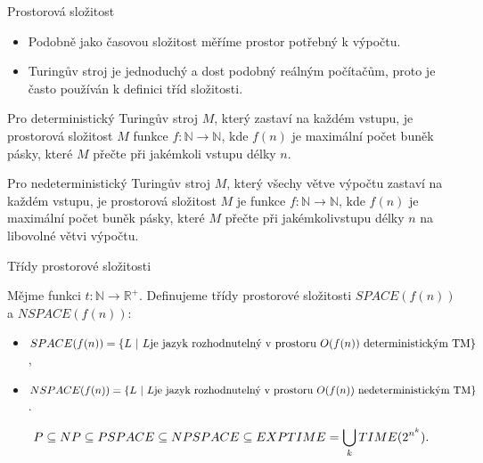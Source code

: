     
    \begin{frame}{Prostorová složitost}
    \begin{itemize}
        \item Podobně jako časovou složitost měříme prostor potřebný k výpočtu.
        \item Turingův stroj je jednoduchý a dost podobný reálným počítačům, proto je často používán k definici tříd složitosti.
    \end{itemize}
    \begin{definition}
    Pro deterministický Turingův stroj $M$, který zastaví na každém vstupu, je
    \alert{prostorová složitost} $M$ funkce $f:\mathbb{N}\to \mathbb{N}$, kde $f(n)$ je maximální počet buněk pásky, které  $M$ přečte při jakémkoli vstupu délky $n$.
    
    
    Pro nedeterministický Turingův stroj $M$, který všechy větve výpočtu zastaví na každém vstupu, je 
    \alert{prostorová složitost} $M$ je funkce $f:\mathbb{N}\to \mathbb{N}$, kde $f(n)$ je maximální počet buněk pásky, které  $M$ přečte při jakémkolivstupu délky $n$ na libovolné větvi výpočtu.
    
    \end{definition}
    \end{frame}
    
    \begin{frame}{Třídy prostorové složitosti}
    \begin{definition}
    Mějme funkci $t: \mathbb{N}\to \mathbb{R}^+$. Definujeme \alert{třídy prostorové složitosti } $SPACE(f(n))$ a $NSPACE(f(n))$: %
    \begin{itemize}
        \item $SPACE(f(n))=\{L \ |\  L \hbox{je jazyk rozhodnutelný v prostoru $O(f(n))$ deterministickým TM}\}$,
        \item $NSPACE(f(n))=\{L \ |\  L \hbox{je jazyk rozhodnutelný v prostoru $O(f(n))$ nedeterministickým TM}\}$.
    \end{itemize}
    \end{definition}
    
    \begin{theorem}
    $$P \subseteq NP \subseteq PSPACE \subseteq NPSPACE \subseteq EXPTIME = \bigcup_k TIME(2^{n^k})\hbox{.} $$
    \end{theorem}
    
    \end{frame}
    
    
    